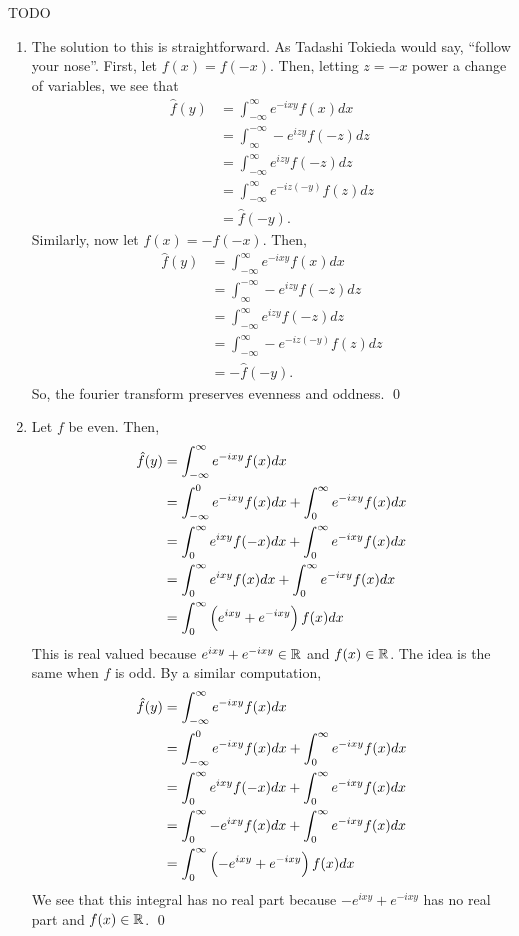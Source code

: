 \documentclass{article}
\begin{document}
\newpage
{} TODO  \tri
\hop 
\solution
\begin{enumerate}
    \item The solution to this is straightforward. As Tadashi Tokieda would say, ``follow your nose''. First, let $f(x)= f(-x)$. Then, letting $z=-x$ power a change of variables, we see that 
    \begin{align*}
        \hat{f}(y) &= \int_{-\infty}^\infty e^{-ixy}f(x)dx\\
        &=  \int_{\infty}^{-\infty} -e^{izy}f(-z)dz\\
        &=  \int_{-\infty}^{\infty} e^{izy}f(-z)dz\\
        &=  \int_{-\infty}^{\infty} e^{-iz(-y)}f(z)dz\\
        &= \hat{f}(-y).
    \end{align*}
    Similarly, now let $f(x)= -f(-x)$. Then, 
    \begin{align*}
        \hat{f}(y) &= \int_{-\infty}^\infty e^{-ixy}f(x)dx\\
        &=  \int_{\infty}^{-\infty} -e^{izy}f(-z)dz\\
        &=  \int_{-\infty}^{\infty} e^{izy}f(-z)dz\\
        &=  \int_{-\infty}^{\infty}- e^{-iz(-y)}f(z)dz\\
        &= -\hat{f}(-y).
    \end{align*}
    So, the fourier transform preserves evenness and oddness. \qed
    \item Let $f$ be even. Then, 
    \begin{align*}
        \hat{f}(y) &= \int_{-\infty}^\infty e^{-ixy}f(x)dx \\
        &= \int_{-\infty}^0 e^{-ixy}f(x)dx + \int_{0}^\infty e^{-ixy}f(x)dx\\
        &= \int_{0}^\infty e^{ixy}f(-x)dx + \int_{0}^\infty e^{-ixy}f(x)dx\\
        &= \int_{0}^\infty e^{ixy}f(x)dx + \int_{0}^\infty e^{-ixy}f(x)dx\\
        &= \int_{0}^\infty\del{ e^{ixy}+ e^{-ixy}}f(x)dx\\
    \end{align*}
    This is real valued because $ e^{ixy}+ e^{-ixy} \in \mathbb{R}$ and $f(x) \in \mathbb{R}$. 
    \hop 
    The idea is the same when $f$ is odd. By a similar computation,
    \begin{align*}
        \hat{f}(y) &= \int_{-\infty}^\infty e^{-ixy}f(x)dx \\
        &= \int_{-\infty}^0 e^{-ixy}f(x)dx + \int_{0}^\infty e^{-ixy}f(x)dx\\
        &= \int_{0}^\infty e^{ixy}f(-x)dx + \int_{0}^\infty e^{-ixy}f(x)dx\\
        &= \int_{0}^\infty -e^{ixy}f(x)dx + \int_{0}^\infty e^{-ixy}f(x)dx\\
        &= \int_{0}^\infty\del{ -e^{ixy}+ e^{-ixy}}f(x)dx\\
    \end{align*}
    We see that this integral has no real part because $-e^{ixy}+ e^{-ixy}$ has no real part and $f(x)\in \mathbb{R}$. \qed
\end{enumerate}
\end{document}
